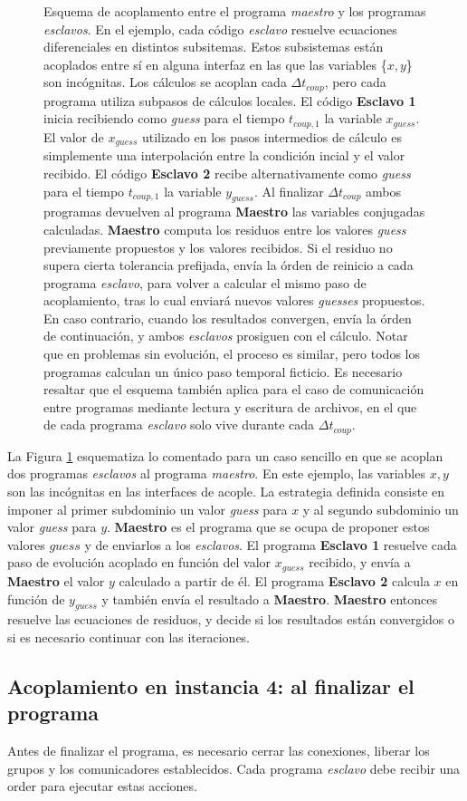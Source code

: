 \begin{figure}
\begin{tikzpicture}
\end{tikzpicture}
\caption[Esquema de acoplamiento entre programas implementado]{Esquema de acoplamento entre el programa \textit{maestro} y los programas \textit{esclavos}.
En el ejemplo, cada código \textit{esclavo} resuelve ecuaciones diferenciales en distintos subsitemas.
Estos subsistemas están acoplados entre sí en alguna interfaz en las que las variables \{$x,y$\} son incógnitas.
Los cálculos se acoplan cada $\Delta t_{coup}$, pero cada programa utiliza subpasos de cálculos locales.
El código \textbf{Esclavo 1} inicia recibiendo como \textit{guess} para el tiempo $t_{coup,1}$ la variable $x_{guess}$.
El valor de $x_{guess}$ utilizado en los pasos intermedios de cálculo es simplemente una interpolación entre la condición incial y el valor recibido.
El código \textbf{Esclavo 2} recibe alternativamente como \textit{guess} para el tiempo $t_{coup,1}$ la variable $y_{guess}$.
Al finalizar $\Delta t_{coup}$ ambos programas devuelven al programa \textbf{Maestro} las variables conjugadas calculadas.
\textbf{Maestro} computa los residuos entre los valores \textit{guess} previamente propuestos y los valores recibidos.
Si el residuo no supera cierta tolerancia prefijada, envía la órden de reinicio a cada programa \textit{esclavo}, 
para volver a calcular el mismo paso de acoplamiento, tras lo cual enviará nuevos valores \textit{guesses} propuestos.
En caso contrario, cuando los resultados convergen, envía la órden de continuación, y ambos \textit{esclavos} prosiguen con el cálculo.
Notar que en problemas sin evolución, el proceso es similar, pero todos los programas calculan un único paso temporal ficticio.
Es necesario resaltar que el esquema también aplica para el caso de comunicación entre programas mediante lectura y escritura de archivos, en el que de cada programa \textit{esclavo} solo vive durante cada $\Delta t_{coup}$.
}
\label{esquema-evolucion}
\end{figure}

La Figura \ref{esquema-evolucion} esquematiza lo comentado para un caso sencillo en que se acoplan dos programas \textit{esclavos} al programa \textit{maestro}.
En este ejemplo, las variables $x,y$ son las incógnitas en las interfaces de acople.
La estrategia definida consiste en imponer al primer subdominio un valor \textit{guess} para $x$ y al segundo subdominio un valor \textit{guess} para $y$.
\textbf{Maestro} es el programa que se ocupa de proponer estos valores $guess$ y de enviarlos a los \textit{esclavos}.
El programa \textbf{Esclavo 1} resuelve cada paso de evolución acoplado en función del valor $x_{guess}$ recibido, y envía a \textbf{Maestro} el valor $y$ calculado a partir de él.
El programa \textbf{Esclavo 2} calcula $x$ en función de $y_{guess}$ y también envía el resultado a \textbf{Maestro}.
\textbf{Maestro} entonces resuelve las ecuaciones de residuos, y decide si los resultados están convergidos o si es necesario continuar con las iteraciones.

\subsection*{Acoplamiento en instancia 4: al finalizar el programa}

Antes de finalizar el programa, es necesario cerrar las conexiones, liberar los grupos y los comunicadores establecidos.
Cada programa \textit{esclavo} debe recibir una order para ejecutar estas acciones.
